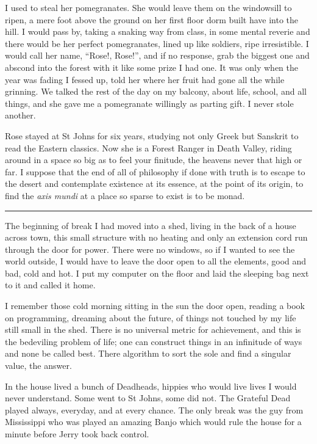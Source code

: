 \documentclass[ebook, 10pt, openright, onecolumn]{memoir}
\newcommand*\starbreak{\fancybreak*{\Large{* * *}}}
\begin{document}
I used to steal her pomegranates.  She would leave them on the windowsill to
ripen, a mere foot above the ground on her first floor dorm built have into the
hill.  I would pass by, taking a snaking way from class, in some mental reverie
and there would be her perfect pomegranates, lined up like soldiers, ripe
irresistible.  I would call her name, ``Rose!, Rose!'', and if no response, grab
the biggest one and abscond into the forest with it like some prize I had one.
It was only when the year was fading I fessed up, told her where her fruit had
gone all the while grinning.  We talked the rest of the day on my balcony, about
life, school, and all things, and she gave me a pomegranate willingly as parting
gift.  I never stole another.

Rose stayed at St Johns for six years, studying not only Greek but Sanskrit to
read the Eastern classics.  Now she is a Forest Ranger in Death Valley, riding
around in a space so big as to feel your finitude, the heavens never that high
or far.  I suppose that the end of all of philosophy if done with truth is to
escape to the desert and contemplate existence at its essence, at the point of
its origin, to find the \textit{axis mundi} at a place so sparse to exist is to
be monad. 

\starbreak

The beginning of break I had moved into a shed, living in the back of a house
across town, this small structure with no heating and only an extension cord run
through the door for power.  There were no windows, so if I wanted to see the
world outside, I would have to leave the door open to all the elements, good and
bad, cold and hot.  I put my computer on the floor and laid the sleeping bag
next to it and called it home.

I remember those cold morning sitting in the sun the door open, reading a book
on programming, dreaming about the future, of things not touched by my life
still small in the shed.  There is no universal metric for achievement, and this
is the bedeviling problem of life; one can construct things in an infinitude of
ways and none be called best.  There algorithm to sort the sole and find a
singular value, the answer.  

In the house lived a bunch of Deadheads, hippies who would live lives I would
never understand.  Some went to St Johns, some did not.  The Grateful Dead
played always, everyday, and at every chance.  The only break was the guy from
Mississippi who was played an amazing Banjo which would rule the house for a
minute before Jerry took back control.
\end{document}
